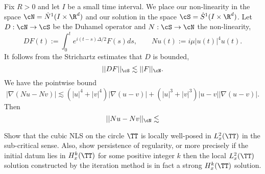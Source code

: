 \begin{solution}
	Fix $R > 0$ and let $I$ be a small time interval. We place our non-linearity in the space $\cN = \dot N^1 (I \times \R^d)$ and our solution in the space $\cS = \dot S^1 (I \times \R^d)$. Let $D : \cN \to \cS$ be the Duhamel operator and $N: \cS \to \cN$ the non-linearity,
		\[ DF(t) := \int_0^t e^{i (t - s) \Delta/2} F(s) ds, \qquad Nu (t) := i \mu |u(t)|^4 u(t). \]
	It follows from the Strichartz estimates that $D$ is bounded, 
		\[ ||DF||_\cS \lesssim ||F||_\cN. \]
	We have the pointwise bound
		\[ |\nabla (Nu - Nv)| \lesssim (|u|^4 + |v|^4) |\nabla (u - v)| + (|u|^3 + |v|^3) |u - v| |\nabla (u - v)|. \]
	Then
		\[ ||Nu - Nv||_\cN \lesssim  \]		
\end{solution}


\begin{statement}
	Show that the cubic NLS on the circle $\TT$ is locally well-posed in $L^2_x (\TT)$ in the sub-critical sense. Also, show persistence of regularity, or more precisely if the initial datum lies in $H^k_x (\TT)$ for some positive integer $k$ then the local $L^2_x (\TT)$ solution constructed by the iteration method is in fact a strong $H^k_x (\TT)$ solution. 
\end{statement}

